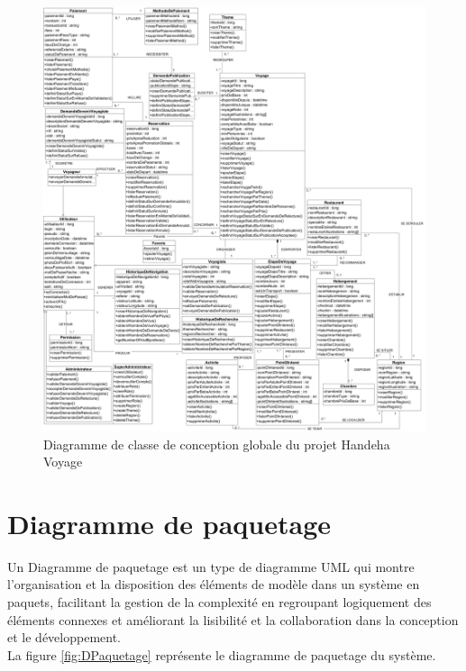 \documentclass[12pt]{report}
\begin{document}
			\begin{figure}[h]
				\centering
				\includegraphics[width=\textwidth]{DCFinal.jpg}
				\caption{Diagramme de classe de conception globale du projet Handeha Voyage}
				\label{fig:DCFinal}
			\end{figure}
			\FloatBarrier

	
			\section{Diagramme de paquetage}

			\hspace{15pt} Un Diagramme de paquetage est un type de diagramme UML qui montre l'organisation et la disposition des éléments de modèle dans un système en paquets, facilitant la gestion de la complexité en regroupant logiquement des éléments connexes et améliorant la lisibilité et la collaboration dans la conception et le développement.\\

			La figure \ref{fig:DPaquetage} représente le diagramme de paquetage du système.
\end{document}
